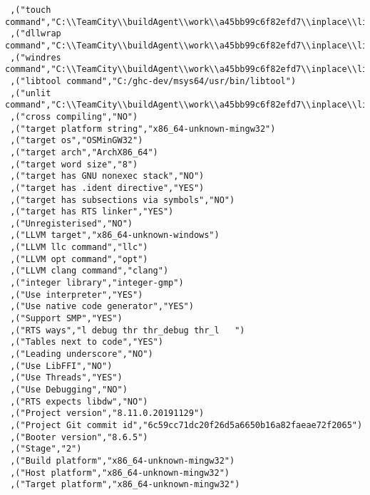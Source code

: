 \begin{verbatim}
 ,("touch command","C:\\TeamCity\\buildAgent\\work\\a45bb99c6f82efd7\\inplace\\lib/bin/touchy.exe")
 ,("dllwrap command","C:\\TeamCity\\buildAgent\\work\\a45bb99c6f82efd7\\inplace\\lib\\../mingw/bin/dllwrap.exe")
 ,("windres command","C:\\TeamCity\\buildAgent\\work\\a45bb99c6f82efd7\\inplace\\lib\\../mingw/bin/windres.exe")
 ,("libtool command","C:/ghc-dev/msys64/usr/bin/libtool")
 ,("unlit command","C:\\TeamCity\\buildAgent\\work\\a45bb99c6f82efd7\\inplace\\lib/bin/unlit.exe")
 ,("cross compiling","NO")
 ,("target platform string","x86_64-unknown-mingw32")
 ,("target os","OSMinGW32")
 ,("target arch","ArchX86_64")
 ,("target word size","8")
 ,("target has GNU nonexec stack","NO")
 ,("target has .ident directive","YES")
 ,("target has subsections via symbols","NO")
 ,("target has RTS linker","YES")
 ,("Unregisterised","NO")
 ,("LLVM target","x86_64-unknown-windows")
 ,("LLVM llc command","llc")
 ,("LLVM opt command","opt")
 ,("LLVM clang command","clang")
 ,("integer library","integer-gmp")
 ,("Use interpreter","YES")
 ,("Use native code generator","YES")
 ,("Support SMP","YES")
 ,("RTS ways","l debug thr thr_debug thr_l   ")
 ,("Tables next to code","YES")
 ,("Leading underscore","NO")
 ,("Use LibFFI","NO")
 ,("Use Threads","YES")
 ,("Use Debugging","NO")
 ,("RTS expects libdw","NO")
 ,("Project version","8.11.0.20191129")
 ,("Project Git commit id","6c59cc71dc20f26d5a6650b16a82faeae72f2065")
 ,("Booter version","8.6.5")
 ,("Stage","2")
 ,("Build platform","x86_64-unknown-mingw32")
 ,("Host platform","x86_64-unknown-mingw32")
 ,("Target platform","x86_64-unknown-mingw32")

\end{verbatim}

